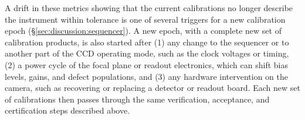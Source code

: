 A drift in these metrics showing that the current calibrations no longer describe the instrument within tolerance is one of several triggers for a new calibration epoch (\S\ref{sec:discussion:sequencer}).
A new epoch, with a complete new set of calibration products, is also started after (1) any change to the sequencer or to another part of the CCD operating mode, such as the clock voltages or timing, (2) a power cycle of the focal plane or readout electronics, which can shift bias levels, gains, and defect populations, and (3) any hardware intervention on the camera, such as recovering or replacing a detector or readout board.
Each new set of calibrations then passes through the same verification, acceptance, and certification steps described above.
